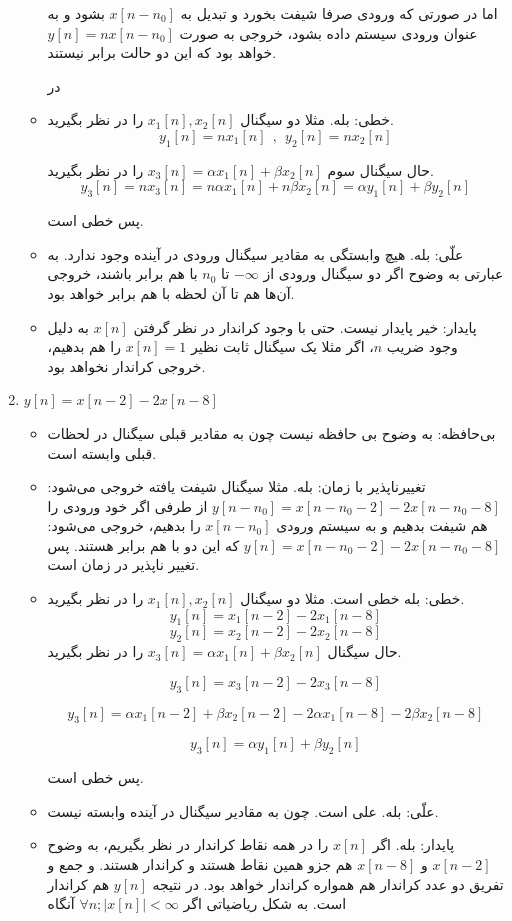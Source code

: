 \documentclass[12pt]{article}
\begin{document}
\begin{enumerate}[label = \harfi*)]
\begin{itemize}
	اما در صورتی که ورودی صرفا شیفت بخورد و تبدیل به $x[n-n_0]$ بشود و به عنوان ورودی سیستم داده بشود، خروجی به صورت
	$y[n]= n x[n-n_0]$
	خواهد بود که این دو حالت برابر نیستند.
	
	در 
	\item
	خطی: بله. مثلا دو سیگنال
	$x_1[n],x_2[n]$
	را در نظر بگیرید.
	$$y_1[n] = nx_1[n] ~~ , ~~ y_2[n] = n x_2[n]$$
	
	حال سیگنال سوم
	$x_3 [n] = \alpha x_1[n] + \beta x_2 [n]$
	را در نظر بگیرید.
	$$y_3[n] = n x_3[n] = n \alpha x_1[n] + n \beta x_2[n] = \alpha y_1[n] + \beta y_2[n]$$
	
	پس خطی است.
	\item
	علّی: بله. هیچ وابستگی به مقادیر سیگنال ورودی در آینده وجود ندارد. به عبارتی به وضوح اگر دو سیگنال ورودی از $-\infty$ تا $n_0$ با هم برابر باشند، خروجی آن‌ها هم تا آن لحظه با هم برابر خواهد بود. 
	\item
	پایدار: خیر پایدار نیست. حتی با وجود کراندار در نظر گرفتن $x[n]$ به دلیل وجود ضریب $n$، اگر مثلا یک سیگنال ثابت نظیر $x[n]=1$ را هم بدهیم، خروجی کراندار نخواهد بود.
\end{itemize}



\item
$y[n] = x[n-2] - 2x[n-8]$
\begin{itemize}
	\item
	بی‌حافظه: به وضوح بی حافظه نیست چون به مقادیر قبلی سیگنال در لحظات قبلی وابسته است.
	\item
	تغییرناپذیر با زمان: بله. مثلا سیگنال شیفت یافته خروجی می‌شود:
	$y[n-n_0] = x[n - n_0 - 2] - 2 x[n - n_0 - 8]$
از طرفی اگر خود ورودی را هم شیفت بدهیم و به سیستم ورودی
 $x[n-n_0]$
 را بدهیم، خروجی می‌شود:
 $y[n] = x[n-n_0 - 2] - 2 x[n-n_0 - 8]$
 که این دو با هم برابر هستند. پس تغییر ناپذیر در زمان است.
	 
	\item
	خطی: بله خطی است. مثلا دو سیگنال
	 $x_1[n],x_2[n]$
	 را در نظر بگیرید.
	 $$y_1[n] =x_1[n-2] - 2 x_1[n-8]$$
	 $$y_2[n] =x_2[n-2] - 2 x_2[n-8]$$
	 حال سیگنال
	 $x_3[n] = \alpha x_1[n] + \beta x_2[n]$
	 را در نظر بگیرید.
	 
	 $$y_3[n] = x_3[n-2] - 2 x_3[n-8]$$
	 
	 $$y_3[n] = \alpha x_1[n-2] + \beta x_2[n-2] - 2\alpha x_1[n-8] - 2 \beta x_2[n-8]$$
	 
	 $$y_3[n] = \alpha y_1[n] + \beta y_2[n]$$
	 
	 پس خطی است.
	\item
	علّی: بله. علی است. چون به مقادیر سیگنال در آینده وابسته نیست. 
	\item
	پایدار: بله. اگر $x[n]$ را در همه نقاط کراندار در نظر بگیریم، به وضوح $x[n-2]$ و $x[n-8]$ هم جزو همین نقاط هستند و کراندار هستند. و جمع و تفریق دو عدد کراندار هم همواره کراندار خواهد بود. در نتیجه $y[n]$ هم کراندار است. به شکل ریاضیاتی اگر
	$\forall n; |x[n]|<\infty$ آنگاه
	

\end{itemize}
\end{enumerate}
\end{document}
